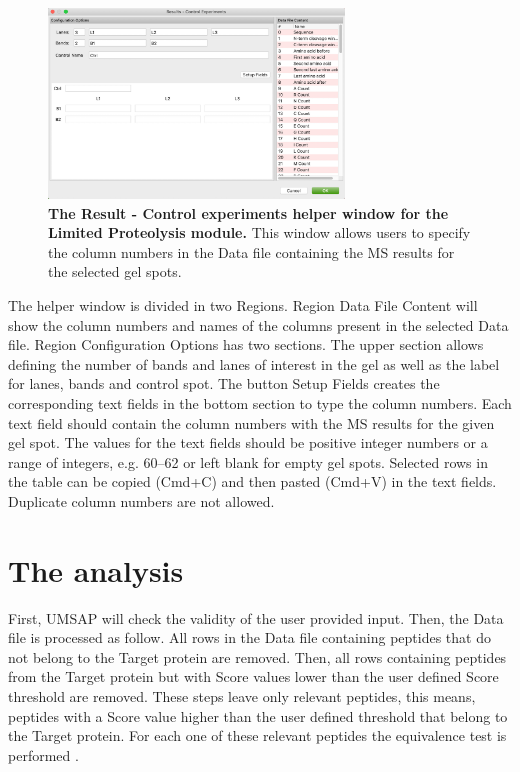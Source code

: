 \begin{figure}[h]
    \centering
    \includegraphics[width=0.7\textwidth]{./IMAGES/MOD-LIMPROT/limprot-rescontrol.jpg}
    \caption[The Result - Control experiments helper window for the Limited Proteolysis module]{\textbf{The Result - Control experiments helper window for the Limited Proteolysis module.} This window allows users to specify the column numbers in the Data file containing the MS results for the selected gel spots.} 
    \label{fig:limprotResControlWindow}
    \vspace{-5pt} 	
\end{figure}

The helper window is divided in two Regions. Region Data File Content will show the 
column numbers and names of the columns present in the selected Data file. Region
Configuration Options has two sections. The upper section allows defining the number
of bands and lanes of interest in the gel as well as the label for lanes, bands and
control spot. The button Setup Fields creates the corresponding text fields in the
bottom section to type the column numbers. Each text field should contain the column
numbers with the MS results for the given gel spot. The values for the text fields
should be positive integer numbers or a range of integers, e.g. 
\numrange[range-phrase=--]{60}{62} or left blank for empty gel spots. Selected rows
in the table can be copied (Cmd+C) and then pasted (Cmd+V) in the text fields. 
Duplicate column numbers are not allowed. 

\section{The analysis}
\label{sec:limprotEquivalenceTest}
First, UMSAP will check the validity of the user provided input. Then, the Data file is processed as follow. All rows in the Data file containing peptides that do not belong to the Target protein are removed. Then, all rows containing peptides from the Target protein but with Score values lower than the user defined Score threshold are removed. These steps leave only relevant peptides, this means, peptides with a Score value higher than the user defined threshold that belong to the Target protein. For each one of these relevant peptides the equivalence test is performed \cite{Limentani2005}.

